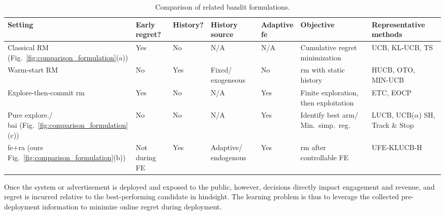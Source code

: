 \documentclass[twoside,11pt]{article}
\newcommand{\ouralg}{\textsc{UFE-KLUCB-H}}
\begin{document}
\begin{table}[t]
\centering
\scriptsize
\renewcommand{\arraystretch}{1.15}
\setlength{\tabcolsep}{3.5pt}
\begin{tabular}{p{2.0cm} p{1.5cm} p{1.5cm} p{1.7cm} p{1.5cm} p{2.5cm} p{2.2cm}}
\toprule
\textbf{Setting} &
\makecell[l]{\textbf{Early} \\ \textbf{regret?}} &
\textbf{History?} &
\makecell[l]{\textbf{History} \\ \textbf{source}}&
\makecell[l]{\textbf{Adaptive} \\ \textbf{\ac{fe}}} &
\textbf{Objective} &
\makecell[l]{\textbf{Representative} \\ \textbf{methods}}  \\
\midrule

Classical RM (Fig.~\ref{fig:comparison_formulation}(a)) &
Yes &
No &
N/A &
N/A &
Cumulative regret minimization &
UCB,  KL-UCB, TS \\
\midrule

Warm-start RM &
No &
Yes &
\makecell[l]{Fixed/ \\  exogeneous }  &
No &
\makecell[l]{\ac{rm} with static \\  history} &
\makecell[l]{HUCB,  OTO,   \\      MIN-UCB} \\
\midrule

Explore-then-commit \ac{rm} &
Yes &
No &
N/A &
Yes &
Finite exploration, then exploitation &
ETC,  EOCP \\
\midrule

\makecell[l]{Pure explore./ \\\ac{bai}  (Fig.~\ref{fig:comparison_formulation}(c)) }&
No &
No &
N/A &
Yes &
\makecell[l]{Identify best arm/ \\ Min.\ simp.\ reg.} &
\makecell[l]{LUCB, UCB($\alpha$)  \\   SH, Track \& Stop }\\
\midrule

\rowcolor{blue!10}
\ac{fe}+\ac{ra} (ours  Fig.~\ref{fig:comparison_formulation}(b)) &
Not during FE &
Yes &
Adaptive/ endogenous &
Yes &
\ac{rm} after controllable FE &
\ouralg{} \\
\bottomrule
\end{tabular}
\caption{Comparison of related bandit formulations.}
\label{tab:comparison}
\end{table}

Once the system or advertisement is deployed and exposed to the public, however, decisions directly impact engagement and revenue, and regret is incurred relative to the best-performing candidate in hindsight. The learning problem is thus to leverage the collected pre-deployment information to minimize online regret during deployment.
\end{document}
